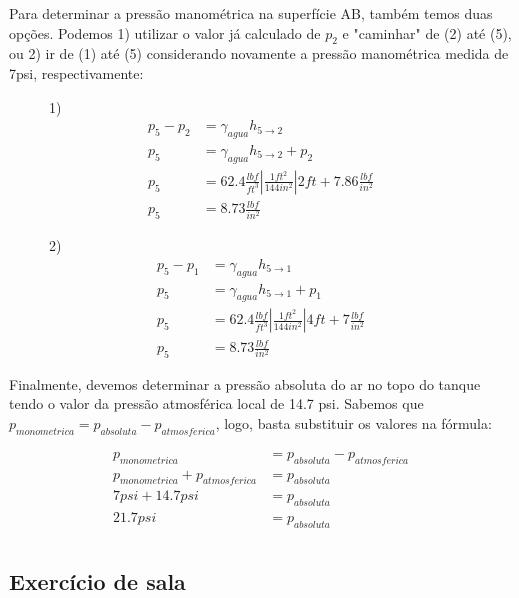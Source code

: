 \documentclass{article}
\begin{document}
Para determinar a pressão manométrica na superfície AB, também temos duas opções. Podemos 1) utilizar o valor já calculado de $p_2$ e "caminhar" de (2) até (5), ou 2) ir de (1) até (5) considerando novamente a pressão manométrica medida de 7psi, respectivamente:

\begin{figure}[!h]
\centering
\begin{minipage}{0.5\textwidth}
     1)
     \begin{align*}
          p_5-p_2&=\gamma_{agua}h_{5\rightarrow2}\\
          p_5&=\gamma_{agua}h_{5\rightarrow2}+p_2\\
          p_5&= 62.4\frac{lbf}{ft^3} \left|\frac{1ft^2}{144in^2} \right|2ft+7.86\frac{lbf}{in^2}\\
          p_5&=8.73\frac{lbf}{in^2}
     \end{align*}
\end{minipage}\hfill
\begin{minipage}{0.5\textwidth}
     2)
     \begin{align*}
          p_5-p_1&=\gamma_{agua}h_{5\rightarrow1}\\
          p_5&=\gamma_{agua}h_{5\rightarrow1}+p_1\\
          p_5&=62.4\frac{lbf}{ft^3}\left|\frac{1ft^2}{144in^2} \right|4ft+7\frac{lbf}{in^2}\\
          p_5&=8.73\frac{lbf}{in^2}
     \end{align*}
\end{minipage}
\end{figure}

Finalmente, devemos determinar a pressão absoluta do ar no topo do tanque tendo o valor da pressão atmosférica local de 14.7 psi. Sabemos que $p_{monometrica}=p_{absoluta}-p_{atmosferica}$, logo, basta substituir os valores na fórmula:

\begin{align*}
     p_{monometrica}&=p_{absoluta}-p_{atmosferica}\\
     p_{monometrica}+p_{atmosferica}&=p_{absoluta}\\
     7psi+14.7psi&=p_{absoluta}\\
     21.7psi&=p_{absoluta}\\
\end{align*}

\newpage
\subsection{Exercício de sala}
\end{document}
